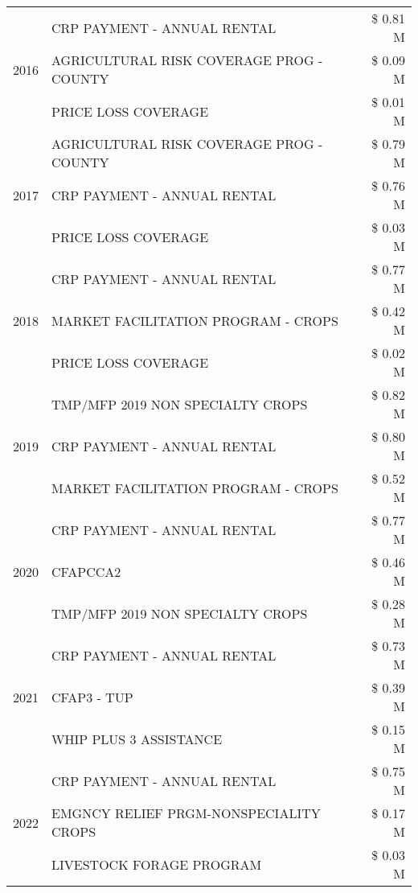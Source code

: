 \begin{tabular}{llr}
\cline{1-3}
\multirow[t]{3}{*}{2016} & CRP PAYMENT - ANNUAL RENTAL & \$ 0.81 M \\
 & AGRICULTURAL RISK COVERAGE PROG - COUNTY & \$ 0.09 M \\
 & PRICE LOSS COVERAGE & \$ 0.01 M \\
\cline{1-3}
\multirow[t]{3}{*}{2017} & AGRICULTURAL RISK COVERAGE PROG - COUNTY & \$ 0.79 M \\
 & CRP PAYMENT - ANNUAL RENTAL & \$ 0.76 M \\
 & PRICE LOSS COVERAGE & \$ 0.03 M \\
\cline{1-3}
\multirow[t]{3}{*}{2018} & CRP PAYMENT - ANNUAL RENTAL & \$ 0.77 M \\
 & MARKET FACILITATION PROGRAM - CROPS & \$ 0.42 M \\
 & PRICE LOSS COVERAGE & \$ 0.02 M \\
\cline{1-3}
\multirow[t]{3}{*}{2019} & TMP/MFP 2019 NON SPECIALTY CROPS & \$ 0.82 M \\
 & CRP PAYMENT - ANNUAL RENTAL & \$ 0.80 M \\
 & MARKET FACILITATION PROGRAM - CROPS & \$ 0.52 M \\
\cline{1-3}
\multirow[t]{3}{*}{2020} & CRP PAYMENT - ANNUAL RENTAL & \$ 0.77 M \\
 & CFAPCCA2 & \$ 0.46 M \\
 & TMP/MFP 2019 NON SPECIALTY CROPS & \$ 0.28 M \\
\cline{1-3}
\multirow[t]{3}{*}{2021} & CRP PAYMENT - ANNUAL RENTAL & \$ 0.73 M \\
 & CFAP3 - TUP & \$ 0.39 M \\
 & WHIP PLUS 3 ASSISTANCE & \$ 0.15 M \\
\cline{1-3}
\multirow[t]{3}{*}{2022} & CRP PAYMENT - ANNUAL RENTAL & \$ 0.75 M \\
 & EMGNCY RELIEF PRGM-NONSPECIALITY CROPS & \$ 0.17 M \\
 & LIVESTOCK FORAGE PROGRAM & \$ 0.03 M \\
\cline{1-3}
\bottomrule
\end{tabular}
